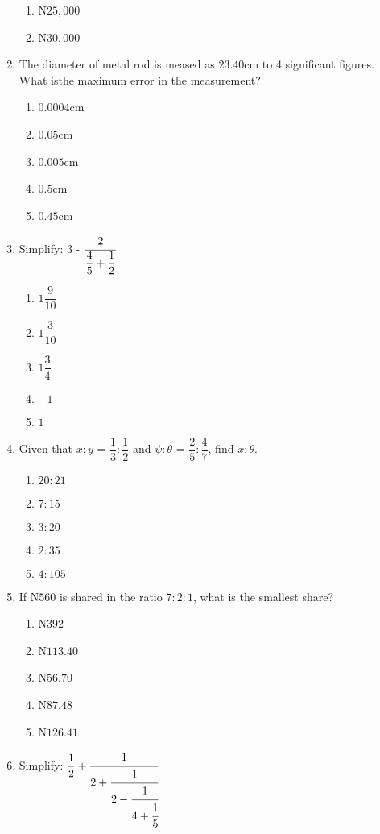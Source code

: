 \begin{multicols}{2}
\begin{enumerate}[label={\arabic*.}]
\begin{enumerate}[label={\Alph*.}]
    \item N\(25,000\)
    \item N\(30,000\)
    \end{enumerate}
\item The diameter of metal rod is meased as \(23.40 \)cm to 4 significant figures. What isthe maximum error in the measurement?
    \begin{enumerate}[label={\Alph*.}]
    \item \(0.0004\)cm
    \item \(0.05\)cm
    \item \(0.005\)cm
    \item \(0.5\)cm
    \item \(0.45\)cm
    \end{enumerate}
\item Simplify: 3 - \(\cfrac{2}{\dfrac{4}{5} + \dfrac{1}{2}}\)
    \begin{enumerate}[label={\Alph*.}]
    \item \(1\dfrac{9}{10}\)
    \item \(1\dfrac{3}{10}\)
    \item \(1\dfrac{3}{4}\)
    \item \(-1\)
    \item \(1\)
    \end{enumerate}
\item Given that \(x:y\) = \(\dfrac{1}{3}:\dfrac{1}{2}\) and \(\psi:\theta\) = \(\dfrac{2}{5}:\dfrac{4}{7}\), find \(x:\theta\).
    \begin{enumerate}[label={\Alph*.}]
    \item \(20:21\)
    \item \(7:15\)
    \item \(3:20\)
    \item \(2:35\)
    \item \(4:105\)
    \end{enumerate}
\item If N\(560\) is shared in the ratio \(7:2:1\), what is the smallest share?
    \begin{enumerate}[label={\Alph*.}]
    \item N\(392\)
    \item N\(113.40\)
    \item N\(56.70\)
    \item N\(87.48\)
    \item N\(126.41\)
    \end{enumerate}
\item Simplify: \(\dfrac{1}{2} + \cfrac{1}{2 + \cfrac{1}{2 - \cfrac{1}{4 + \cfrac{1}{5}}}}\)

\end{enumerate}
\end{multicols}

